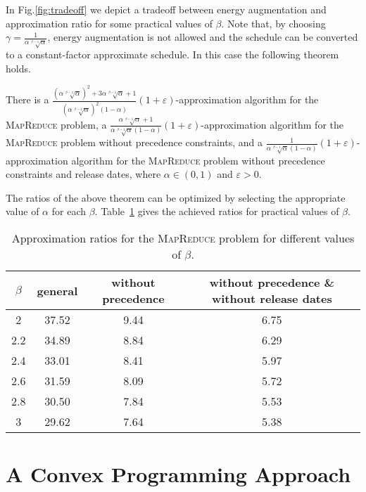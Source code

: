 \documentclass{llncs}
\newcommand{\mr}{\textsc{MapReduce}\xspace}
\begin{document}
In Fig.\ref{fig:tradeoff} we depict a tradeoff between energy augmentation and approximation ratio for some practical values of $\beta$.
Note that, by choosing $\gamma=\frac{1}{\alpha \sqrt[\beta-1]{\alpha}}$, energy augmentation is not allowed and the schedule can be converted to a constant-factor approximate schedule.
In this case the following theorem holds.

\begin{theorem}
There is a $\frac{(\alpha \sqrt[\beta-1]{\alpha})^2+3\alpha \sqrt[\beta-1]{\alpha}+1}{(\alpha \sqrt[\beta-1]{\alpha})^2(1-\alpha)}(1+\varepsilon)$-approximation algorithm for the \mr problem,
a $\frac{\alpha \sqrt[\beta-1]{\alpha}+1}{\alpha \sqrt[\beta-1]{\alpha}(1-\alpha)}(1+\varepsilon)$-approximation algorithm for the \mr problem without precedence constraints,
and a $\frac{1}{\alpha \sqrt[\beta-1]{\alpha}(1-\alpha)}(1+\varepsilon)$-approximation algorithm for the \mr problem without precedence constraints and release dates,
where $\alpha\in(0,1)$ and $\varepsilon>0$.
\end{theorem}

The ratios of the above theorem can be optimized by selecting the appropriate value of $\alpha$ for each $\beta$.
Table~\ref{tbl:results} gives the achieved ratios for practical values of $\beta$.

\begin{table}[htb]
\begin{center}
\begin{tabular}{c||c|c|c}
  $\beta$ & general & without precedence & without precedence \& without release dates \\
  \hline
  \hline
  2   & 37.52 & 9.44 & 6.75 \\
  2.2 & 34.89 & 8.84 & 6.29 \\
  2.4 & 33.01 & 8.41 & 5.97 \\
  2.6 & 31.59 & 8.09 & 5.72 \\
  2.8 & 30.50 & 7.84 & 5.53 \\
  3   & 29.62 & 7.64 & 5.38
\end{tabular}
\end{center}
\caption{Approximation ratios for the \mr problem for different values of $\beta$.}
\label{tbl:results}
\end{table}

\section{A Convex Programming Approach}\label{se:cp}
\end{document}
